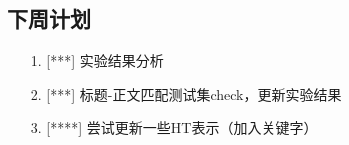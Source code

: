\documentclass[11pt]{article}
\begin{document}
\begin{CJK}{UTF8}{gkai}
\section{下周计划}
\begin{itemize}
\item [1.] [***] 实验结果分析
\item [2.] [***] 标题-正文匹配测试集check，更新实验结果
\item [3.] [****] 尝试更新一些HT表示（加入关键字）
\end{itemize}
%
%
%

\end{CJK}
\end{document}
